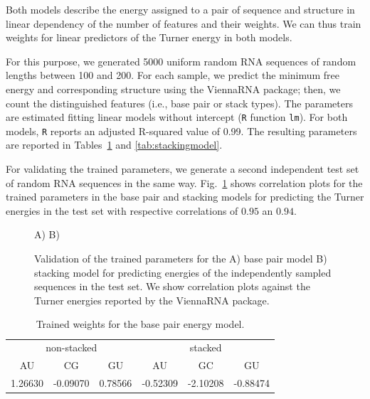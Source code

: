 \documentclass[10pt]{article}
\makeatletter
\newlength{\@aligneps}
\newcommand{\includegraphicstop}[2][]{%
\sbox{\@alignepsbox}{\texttt{[image: \#2]}}%
\setlength{\@aligneps}{-\ht\@alignepsbox}%
\addtolength{\@aligneps}{2ex}%
\raisebox{\@aligneps}{\usebox{\@alignepsbox}}}
\makeatother
\begin{document}
Both models describe the energy assigned to a pair of sequence and
structure in linear dependency of the number of features and their
weights. We can thus train weights for linear predictors of the Turner
energy in both models.

For this purpose, we generated 5000 uniform random RNA sequences of
random lengths between 100 and 200. For each sample, we predict the
minimum free energy and corresponding structure using the ViennaRNA
package; then, we count the distinguished features (i.e., base pair or
stack types). The parameters are estimated fitting linear models
without intercept (\texttt{R} function \texttt{lm}). For both models,
\texttt{R} reports an adjusted R-squared value of 0.99. The resulting
parameters are reported in Tables~\ref{tab:basepairmodel} and
\ref{tab:stackingmodel}.

For validating the trained parameters, we generate a second
independent test set of random RNA sequences in the same
way. Fig.~\ref{fig:training-cor} shows correlation plots for the
trained parameters in the base pair and stacking models for predicting
the Turner energies in the test set with respective correlations of
$0.95$ an $0.94$.

\begin{figure}[h!]
  \centering
  A)\includegraphicstop[width=0.4\textwidth,trim=0 0 0 50,clip]{Figs/basepaircor}
  B)\includegraphicstop[width=0.4\textwidth,trim=0 0 0 50,clip]{Figs/stackingcor}
  \caption{Validation of the trained parameters for the A) base pair
    model B) stacking model for predicting energies of the
    independently sampled sequences in the test set. We show
    correlation plots against the Turner energies reported by the
    ViennaRNA package.}
  \label{fig:training-cor}
\end{figure}

\begin{table}[b]
  \centering
  \caption{Trained weights for the base pair energy model.}
  \label{tab:basepairmodel}
  \begin{tabular}{c@{\quad}c@{\quad}c@{\quad}|@{\quad}c@{\quad}c@{\quad}c}
    \multicolumn{3}{c}{non-stacked} & \multicolumn{3}{c}{stacked}\\
    AU      & CG       & GU      & AU       & GC       & GU \\\hline
    1.26630 & -0.09070 & 0.78566 & -0.52309 & -2.10208 & -0.88474
  \end{tabular}
\end{table}

\end{document}

